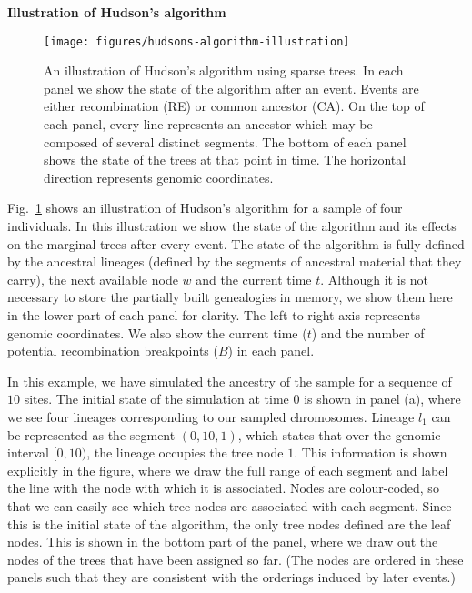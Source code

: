 \documentclass[10pt,letterpaper]{article}
\begin{document}
\textbf{Illustration of Hudson's algorithm}

\begin{figure}
    \begin{center}
        \texttt{[image: figures/hudsons-algorithm-illustration]}
    \end{center}
    \caption{\label{fig-hudsons-algorithm-illustration} An illustration
    of Hudson's algorithm using sparse trees. In each
    panel we show the state of the algorithm after an event. Events
    are either recombination (RE) or common ancestor (CA). On the top
    of each panel, every line represents an ancestor which may
    be composed of several distinct segments. The bottom of each
    panel shows the state of the trees at that point in time. The
    horizontal direction represents genomic coordinates.
    }
\end{figure}

Fig.~\ref{fig-hudsons-algorithm-illustration} shows an illustration of
Hudson's algorithm for a sample of four individuals. In this illustration we
show the state of the algorithm and its effects on the marginal trees after
every event. The state of the algorithm is fully defined by the ancestral
lineages (defined by the segments of ancestral material that they carry),
the next available node $w$ and the current time $t$. Although it is
not necessary to store the partially built genealogies in memory, we show them
here in the lower part of each panel for clarity. The left-to-right axis
represents genomic coordinates. We also show the current time ($t$)
and the number of potential recombination breakpoints ($B$) in each panel.

In this example, we have simulated the ancestry of the sample for a sequence of
$10$ sites. The initial state of the simulation at time $0$ is shown in panel
(a), where we see four lineages corresponding to our sampled chromosomes.
Lineage $l_1$ can be represented as the segment $(0, 10, 1)$, which states that
over the genomic interval $[0, 10)$, the lineage occupies the tree node $1$.
This information is shown explicitly in the figure, where we draw the full range
of each segment and label the line with the node with which it is associated.
Nodes
are colour-coded, so that we can easily see which tree nodes are associated
with each segment. Since this is the initial state of the algorithm, the only
tree nodes defined are the leaf nodes. This is shown in the bottom part of the
panel, where we draw out the nodes of the trees that have been assigned so far.
(The nodes are ordered in these panels such that they are consistent with the
orderings induced by later events.)
\end{document}

